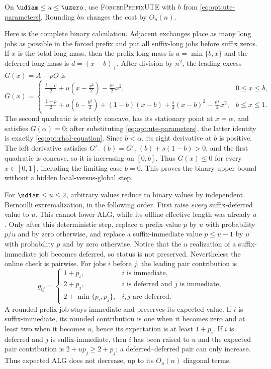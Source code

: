 On $\udiam\le u\le \uzero$, use
\textsc{ForcedPrefixUTE} with $b$ from \cref{eq:opt:ute-parameters}.  Rounding
$bn$ changes the cost by $O_u(n)$.

Here is the complete binary calculation.  Adjacent exchanges place as many
long jobs as possible in the forced prefix and put all suffix-long jobs
before suffix zeros.  If $x$ is the total long mass, then the prefix-long
mass is $a=\min\{b,x\}$ and the deferred-long mass is
$d=(x-b)_+$.  After division by $n^2$, the leading excess
$G(x)=A-\rho O$ is
\begin{equation}
G(x)=
\begin{cases}
\displaystyle
 \frac{1-\rho}{2}+u\left(x-\frac{x^2}{2}\right)
 -\frac{\rho s}{2}x^2,
 &0\le x\le b,\\[3mm]
\displaystyle
 \frac{1-\rho}{2}
 +u\left(b-\frac{b^2}{2}\right)
 +(1-b)(x-b)+\frac{s}{2}(x-b)^2
 -\frac{\rho s}{2}x^2,
 &b\le x\le1.
\end{cases}
\label{eq:opt:binary-upper-gap}
\end{equation}
The second quadratic is strictly concave, has its stationary point at
$x=\alpha$, and satisfies $G(\alpha)=0$; after substituting
\cref{eq:opt:ute-parameters}, the latter identity is exactly
\cref{eq:opt:rhoI-equation}.  Since $b<\alpha$, its right derivative at $b$
is positive.  The left derivative satisfies
$G'_-(b)=G'_+(b)+s(1-b)>0$, and the first quadratic is concave, so it is
increasing on $[0,b]$.  Thus $G(x)\le0$ for every $x\in[0,1]$, including
the limiting case $b=0$.  This proves the binary upper bound without a
hidden local-versus-global step.

For $\udiam\le u\le2$, arbitrary values reduce to binary values by
independent Bernoulli extremalization, in the following order.  First raise
\emph{every} suffix-deferred value to $u$.  This cannot lower ALG, while its
offline effective length was already $u$.  Only after this deterministic
step, replace a prefix value $p$ by $u$ with probability $p/u$ and by zero
otherwise, and replace a suffix-immediate value $p\le u-1$ by $u$ with
probability $p$ and by zero otherwise.  Notice that the $u$ realization
of a suffix-immediate job becomes deferred, so status is not preserved.
Nevertheless the online check is pairwise.  For jobs $i$ before $j$, the
leading pair contribution is
\begin{equation}
 g_{ij}=\begin{cases}
 1+p_i,&i\text{ is immediate},\\
 2+p_j,&i\text{ is deferred and }j\text{ is immediate},\\
 2+\min\{p_i,p_j\},&i,j\text{ are deferred}.
 \end{cases}
 \label{eq:opt:pair-contribution}
\end{equation}
A rounded prefix job stays immediate and preserves its expected value.  If
$i$ is suffix-immediate, its rounded contribution is one when it becomes
zero and at least two when it becomes $u$, hence its expectation is at least
$1+p_i$.  If $i$ is deferred and $j$ is suffix-immediate, then $i$ has been
raised to $u$ and the expected pair contribution is
$2+up_j\ge2+p_j$; a deferred--deferred pair can only increase.  Thus
expected ALG does not decrease, up to its $O_u(n)$ diagonal terms.

